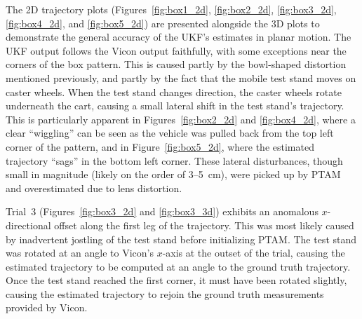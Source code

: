 The 2D trajectory plots (Figures~\ref{fig:box1_2d}, \ref{fig:box2_2d}, \ref{fig:box3_2d}, \ref{fig:box4_2d}, and \ref{fig:box5_2d}) are presented alongside the 3D plots to demonstrate the general accuracy of the UKF's estimates in planar motion. The UKF output follows the Vicon output faithfully, with some exceptions near the corners of the box pattern. This is caused partly by the bowl-shaped distortion mentioned previously, and partly by the fact that the mobile test stand moves on caster wheels. When the test stand changes direction, the caster wheels rotate underneath the cart, causing a small lateral shift in the test stand's trajectory. This is particularly apparent in Figures~\ref{fig:box2_2d} and \ref{fig:box4_2d}, where a clear ``wiggling'' can be seen as the vehicle was pulled back from the top left corner of the pattern, and in Figure~\ref{fig:box5_2d}, where the estimated trajectory ``sags'' in the bottom left corner. These lateral disturbances, though small in magnitude (likely on the order of 3--5~cm), were picked up by PTAM and overestimated due to lens distortion.

Trial~3 (Figures~\ref{fig:box3_2d} and \ref{fig:box3_3d}) exhibits an anomalous $x$-directional offset along the first leg of the trajectory. This was most likely caused by inadvertent jostling of the test stand before initializing PTAM. The test stand was rotated at an angle to Vicon's $x$-axis at the outset of the trial, causing the estimated trajectory to be computed at an angle to the ground truth trajectory. Once the test stand reached the first corner, it must have been rotated slightly, causing the estimated trajectory to rejoin the ground truth measurements provided by Vicon.

\clearpage

